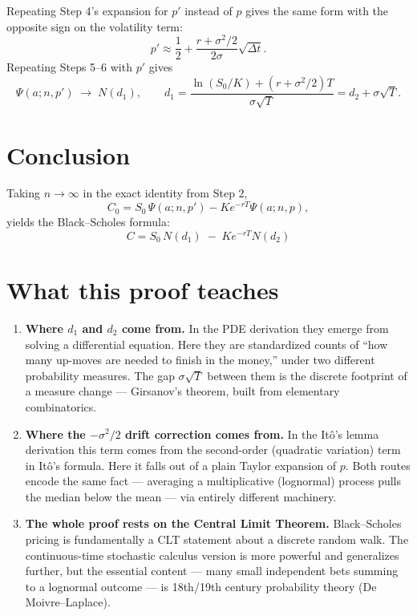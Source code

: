 \documentclass[11pt]{article}
\begin{document}
Repeating Step 4's expansion for $p'$ instead of $p$ gives the same form with the
opposite sign on the volatility term:
\[
  p' \approx \frac{1}{2} + \frac{r + \sigma^2/2}{2\sigma}\sqrt{\Delta t}.
\]
Repeating Steps 5--6 with $p'$ gives
\[
  \Psi(a; n, p') \;\longrightarrow\; N(d_1), \qquad
  d_1 = \frac{\ln(S_0/K) + \left(r + \sigma^2/2\right) T}{\sigma\sqrt{T}} = d_2 + \sigma\sqrt{T}.
\]

\section*{Conclusion}

Taking $n \to \infty$ in the exact identity from Step 2,
\[
  C_0 = S_0\, \Psi(a; n, p') - K e^{-rT} \Psi(a; n, p),
\]
yields the Black--Scholes formula:
\[
  \boxed{\; C = S_0\, N(d_1) \;-\; K e^{-rT} N(d_2) \;}
\]

\section*{What this proof teaches}

\begin{enumerate}
  \item \textbf{Where $d_1$ and $d_2$ come from.} In the PDE derivation they emerge from
  solving a differential equation. Here they are standardized counts of ``how many
  up-moves are needed to finish in the money,'' under two different probability
  measures. The gap $\sigma\sqrt{T}$ between them is the discrete footprint of a
  measure change --- Girsanov's theorem, built from elementary combinatorics.

  \item \textbf{Where the $-\sigma^2/2$ drift correction comes from.} In the It\^o's
  lemma derivation this term comes from the second-order (quadratic variation) term in
  It\^o's formula. Here it falls out of a plain Taylor expansion of $p$. Both routes
  encode the same fact --- averaging a multiplicative (lognormal) process pulls the
  median below the mean --- via entirely different machinery.

  \item \textbf{The whole proof rests on the Central Limit Theorem.} Black--Scholes
  pricing is fundamentally a CLT statement about a discrete random walk. The
  continuous-time stochastic calculus version is more powerful and generalizes further,
  but the essential content --- many small independent bets summing to a lognormal
  outcome --- is 18th/19th century probability theory (De Moivre--Laplace).
\end{enumerate}
\end{document}
